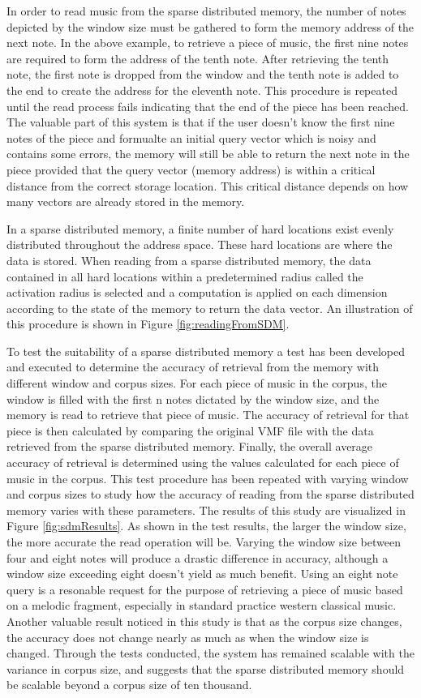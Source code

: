 In order to read music from the sparse distributed memory, the number of notes depicted by the window size must be gathered to form the memory address of the next note. In the above example, to retrieve a piece of music, the first nine notes are required to form the address of the tenth note. After retrieving the tenth note, the first note is dropped from the window and the tenth note is added to the end to create the address for the eleventh note. This procedure is repeated until the read process fails indicating that the end of the piece has been reached. The valuable part of this system is that if the user doesn't know the first nine notes of the piece and formualte an initial query vector which is noisy and contains some errors, the memory will still be able to return the next note in the piece provided that the query vector (memory address) is within a critical distance from the correct storage location. This critical distance depends on how many vectors are already stored in the memory.

In a sparse distributed memory, a finite number of hard locations exist evenly distributed throughout the address space. These hard locations are where the data is stored. When reading from a sparse distributed memory, the data contained in all hard locations within a predetermined radius called the activation radius is selected and a computation is applied on each dimension according to the state of the memory to return the data vector. An illustration of this procedure is shown in Figure \ref{fig:readingFromSDM}.

To test the suitability of a sparse distributed memory a test has been developed and executed to determine the accuracy of retrieval from the memory with different window and corpus sizes. For each piece of music in the corpus, the window is filled with the first n notes dictated by the window size, and the memory is read to retrieve that piece of music. The accuracy of retrieval for that piece is then calculated by comparing the original VMF file with the data retrieved from the sparse distributed memory. Finally, the overall average accuracy of retrieval is determined using the values calculated for each piece of music in the corpus. This test procedure has been repeated with varying window and corpus sizes to study how the accuracy of reading from the sparse distributed memory varies with these parameters. The results of this study are visualized in Figure \ref{fig:sdmResults}. As shown in the test results, the larger the window size, the more accurate the read operation will be. Varying the window size between four and eight notes will produce a drastic difference in accuracy, although a window size exceeding eight doesn't yield as much benefit. Using an eight note query is a resonable request for the purpose of retrieving a piece of music based on a melodic fragment, especially in standard practice western classical music. Another valuable result noticed in this study is that as the corpus size changes, the accuracy does not change nearly as much as when the window size is changed. Through the tests conducted, the system has remained scalable with the variance in corpus size, and suggests that the sparse distributed memory should be scalable beyond a corpus size of ten thousand. 

